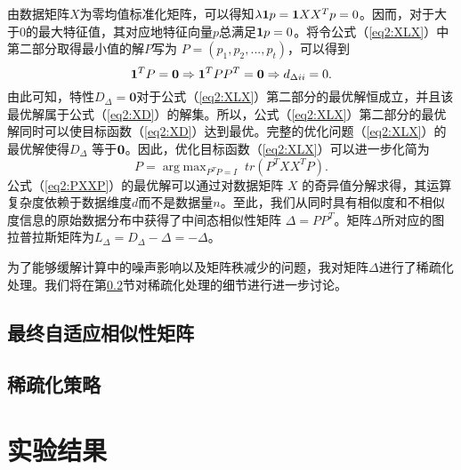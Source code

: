 由数据矩阵$X$为零均值标准化矩阵，可以得知$\lambda {\bf1}p = {\bf1}XX^Tp = 0$。因而，对于大于$0$的最大特征值，其对应地特征向量$p$总满足${\bf1}p = 0$。将令公式（\ref{eq2:XLX}）中第二部分取得最小值的解$P$写为 $P=(p_1,p_2,...,p_t)$，可以得到
\begin{equation}
	{\bf1}^T P = {\bf0} \Rightarrow {\bf1}^T PP^T = {\bf0} \Rightarrow d_{\Delta ii} = 0. %
\end{equation}
由此可知，特性$D_\Delta = \textbf{0}$对于公式（\ref{eq2:XLX}）第二部分的最优解恒成立，并且该最优解属于公式（\ref{eq2:XD}）的解集。所以，公式（\ref{eq2:XLX}）第二部分的最优解同时可以使目标函数（\ref{eq2:XD}）达到最优。完整的优化问题（\ref{eq2:XLX}）的最优解使得$D_\Delta$ 等于$\bf0$。因此，优化目标函数（\ref{eq2:XLX}）可以进一步化简为
\begin{equation}
	P=\mathop{\mathrm{arg\;max}}_{P^TP=I} \;tr(P^TXX^TP).
	\label{eq2:PXXP}
\end{equation}
公式（\ref{eq2:PXXP}）的最优解可以通过对数据矩阵 $X$ 的奇异值分解求得，其运算复杂度依赖于数据维度$d$而不是数据量$n$。至此，我们从同时具有相似度和不相似度信息的原始数据分布中获得了中间态相似性矩阵 $\Delta = PP^T$。矩阵$\Delta$所对应的图拉普拉斯矩阵为$L_\Delta = D_\Delta-\Delta =-\Delta $。

为了能够缓解计算中的噪声影响以及矩阵秩减少的问题，我对矩阵$\Delta$进行了稀疏化处理。我们将在第\ref{sec2:sparse}节对稀疏化处理的细节进行进一步讨论。

\subsection{最终自适应相似性矩阵}
\subsection{稀疏化策略}
\label{sec2:sparse}
\section{实验结果}
\label{sec2:Exp}